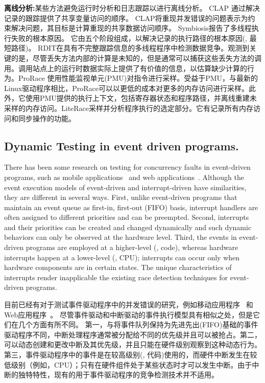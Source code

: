 \textbf{离线分析:}某些方法避免运行时分析和日志跟踪以进行离线分析。 CLAP \cite{huang2013clap} 通过解决记录的跟踪提供了共享变量访问的顺序。 CLAP将重现并发错误的问题表示为约束解决问题，其目标是计算重现的共享数据访问顺序。 Symbiosis\cite{machado2015concurrency}报告了多线程执行失败的根本原因。 它由五个阶段组成，以解决记录的执行路径的根本原因(\ie, 最短路径)。 RDIT\cite{huang2016precise}在具有不完整跟踪信息的多线程程序中检测数据竞争。观测到关键的是，尽管丢失方法内部的计算是未知的，但是通常可以捕获这些丢失方法的调用。调用站点上的运行时数据实际上提供了有价值的信息，以估算缺少计算的行为。ProRace\cite{zhang2017prorace} 使用性能监视单元(PMU)对指令进行采样。受益于PMU，与最新的Linux驱动程序相比，ProRace可以以更低的成本对更多的内存访问进行采样。此外，它使用PMU提供的执行上下文，包括寄存器状态和程序路径，并离线重建未采样的内存访问。LiteRace\cite{marino2009literace}采样并分析程序执行的选定部分。它有记录所有内存访问和同步操作的功能。

\subsection{Dynamic Testing in event driven programs.}
There has been some research on testing for concurrency faults in event-driven
programs, such as mobile applications~\cite{Hsiao2014, Maiya14, Hu2016, bielik2015scalable} 
and web applications~\cite{raychev2013effective,hong2014detecting}. 
Although the event execution models of event-driven and interrupt-driven
have similarities, they are different in several ways. 
First, unlike event-driven programs that maintain an event queue as first-in,
first-out (FIFO) basis, interrupt handlers are often assigned to different priorities 
and can be preempted. Second, interrupts and their priorities
can be created and changed dynamically and such dynamic behaviors
can only be observed at the hardware level. 
Third, the events in event-driven programs are employed
at a higher-level (\eg, code), whereas hardware interrupts happen at a 
lower-level (\eg, CPU); interrupts can occur only when hardware
components are in certain states. The unique characteristics of interrupts 
render inapplicable the existing race detection techniques for event-driven
programs. 

目前已经有对于测试事件驱动程序中的并发错误的研究，例如移动应用程序~\cite{Hsiao2014, Maiya14, Hu2016, bielik2015scalable} 和Web应用程序~\cite{raychev2013effective,hong2014detecting}。 尽管事件驱动和中断驱动的事件执行模型具有相似之处，但是它们在几个方面有所不同。 第一，与将事件队列保持为先进先出(FIFO)基础的事件驱动程序不同，中断处理程序通常被分配给不同的优先级并且可以被抢占。第二，可以动态创建和更改中断及其优先级，并且只能在硬件级别观察到这种动态行为。 第三，事件驱动程序中的事件是在较高级别(\eg, 代码)使用的，而硬件中断发生在较低级别（例如，CPU）；只有在硬件组件处于某些状态时才可以发生中断。由于中断的独特特性，现有的用于事件驱动程序的竞争检测技术并不适用。

